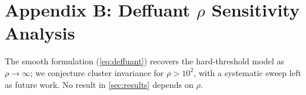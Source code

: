\documentclass[11pt]{article}
\begin{document}
\section*{Appendix B: Deffuant $\rho$ Sensitivity Analysis}

The smooth formulation (\cref{eq:deffuant}) recovers the hard-threshold model
as $\rho \to \infty$; we conjecture cluster invariance for $\rho > 10^2$, with
a systematic sweep left as future work. No result in \cref{sec:results}
depends on $\rho$.
\end{document}
